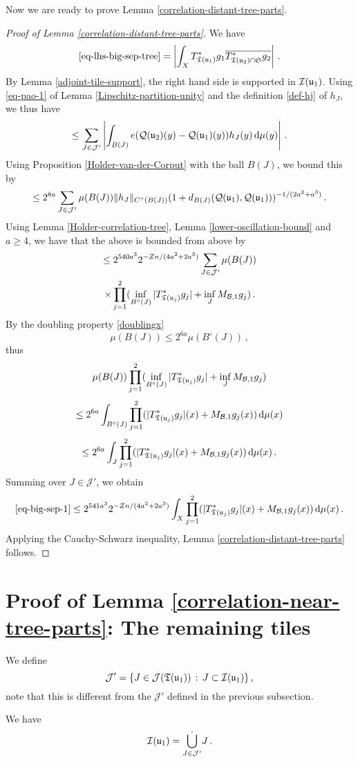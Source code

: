 {    Now we are ready to prove Lemma \ref{correlation-distant-tree-parts}.
    \begin{proof}[Proof of Lemma \ref{correlation-distant-tree-parts}]
    We have
    $$
        \eqref{eq-lhs-big-sep-tree} = \left| \int_{X} T_{{\mathfrak T}({\mathfrak u}_1)}^* g_1 \overline{T_{{\mathfrak T}({\mathfrak u}_2) \cap \mathfrak{S}}^* g_2 }\right|\,.
    $$
    By Lemma \ref{adjoint-tile-support}, the right hand side is supported in ${\mathcal{I}}({\mathfrak u}_1)$. Using \eqref{eq-pao-1} of Lemma \ref{Lipschitz-partition-unity} and the definition \eqref{def-hj} of $h_J$, we thus have
    $$
        \le  \sum_{J \in \mathcal{J}'} \left|\int_{B(J)} e({\mathcal{Q}}({\mathfrak u}_2)(y) - {\mathcal{Q}}({\mathfrak u}_1)(y)) h_J(y) \, \mathrm{d}\mu(y) \right|\,.
    $$
    Using Proposition \ref{Holder-van-der-Corput} with the ball $B(J)$, we bound this by
    $$
        \le 2^{8a} \sum_{J \in \mathcal{J}'} \mu(B(J)) \|h_J\|_{C^{\tau}(B(J))} (1 + d_{B(J)}({\mathcal{Q}}({\mathfrak u}_1), {\mathcal{Q}}({\mathfrak u}_1)))^{-1/(2a^2+a^3)}\,.
    $$
    Using Lemma \ref{Holder-correlation-tree}, Lemma \ref{lower-oscillation-bound} and $a \ge 4$, we have that the above is bounded from above by
    \begin{multline}
        \label{eq-big-sep-1}
        \le 2^{540a^3} 2^{-Zn/(4a^2 + 2a^3)} \sum_{J \in \mathcal{J}'} \mu(B(J)) \\
        \times \prod_{j=1}^2 (\inf_{B^\circ{}(J)} |T_{{\mathfrak T}({\mathfrak u}_j)}^* g_j| + \inf_J M_{\mathcal{B},1} g_j)\,.
    \end{multline}
    By the doubling property \eqref{doublingx}
    $$
        \mu(B(J)) \le 2^{6a} \mu(B^\circ{}(J))\,,
    $$
    thus
    $$
        \mu(B(J)) \prod_{j=1}^2 (\inf_{B^\circ{}(J)} |T_{{\mathfrak T}({\mathfrak u}_j)}^* g_j| + \inf_J M_{\mathcal{B},1} g_j)
    $$
    $$
        \le 2^{6a} \int_{B^\circ{}(J)} \prod_{j=1}^2 ( |T_{{\mathfrak T}({\mathfrak u}_j)}^* g_j|(x) +  M_{\mathcal{B},1} g_j(x)) \, \mathrm{d}\mu(x)
    $$
    $$
        \le 2^{6a} \int_J \prod_{j=1}^2 ( |T_{{\mathfrak T}({\mathfrak u}_j)}^* g_j|(x) +  M_{\mathcal{B},1} g_j(x)) \, \mathrm{d}\mu(x)\,.
    $$
    Summing over $J \in \mathcal{J}'$, we obtain
    $$
        \eqref{eq-big-sep-1} \le 2^{541a^3} 2^{-Zn/(4a^2 + 2a^3)} \int_X \prod_{j=1}^2 ( |T_{{\mathfrak T}({\mathfrak u}_j)}^* g_j|(x) +  M_{\mathcal{B},1} g_j(x)) \, \mathrm{d}\mu(x)\,.
    $$
    Applying the Cauchy-Schwarz inequality, Lemma \ref{correlation-distant-tree-parts} follows.
    \end{proof}

\section{Proof of Lemma \ref{correlation-near-tree-parts}: The remaining tiles}
    \label{subsec-rest-tiles}
    We define
    $$
        \mathcal{J}' = \{J \in \mathcal{J}({\mathfrak T}({\mathfrak u}_1)) \, : \, J \subset {\mathcal{I}}({\mathfrak u}_1)\}\,,
    $$
    note that this is different from the $\mathcal{J}'$ defined in the previous subsection.
    \begin{lemma}
        \label{dyadic-partition-2}
        We have
        $$
            {\mathcal{I}}({\mathfrak u}_1) = \dot{\bigcup_{J \in \mathcal{J}'}} J\,.
        $$
    \end{lemma}

}
